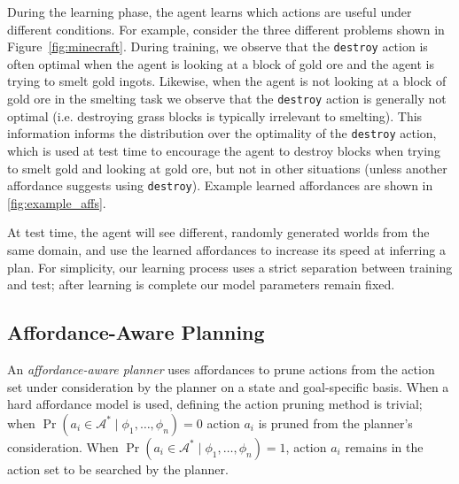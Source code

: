 \documentclass[letterpaper]{article}
\begin{document}
During the learning phase, the agent learns which actions are useful
under different conditions.  For example, consider the three different
problems shown in Figure~\ref{fig:minecraft}.  During training, we observe
that the \texttt{destroy} action is often optimal when the agent is
looking at a block of gold ore and the agent is trying to smelt gold
ingots.  Likewise, when the agent is not looking at a block of gold
ore in the smelting task we observe that the \texttt{destroy} action
is generally not optimal (i.e. destroying grass blocks is typically
irrelevant to smelting).  This information informs the distribution
over the optimality of the \texttt{destroy} action, which is used at
test time to encourage the agent to destroy blocks when trying to
smelt gold and looking at gold ore, but not in other situations
(unless another affordance suggests using \texttt{destroy}). Example
learned affordances are shown in \ref{fig:example_affs}.

At test time, the agent will see different, randomly generated worlds
from the same domain, and use the learned affordances to increase its
speed at inferring a plan.  For simplicity, our learning process uses
a strict separation between training and test; after learning is
complete our model parameters remain fixed. 




\subsection{Affordance-Aware Planning}
\label{sec:action_pruning}
An {\em affordance-aware planner} uses affordances 
to prune actions from the action set under consideration 
by the planner on a state and
goal-specific basis. When a hard affordance model is used, defining
the action pruning method is trivial; when
$\Pr(a_i \in \mathcal{A}^*  \mid \phi_1, \ldots, \phi_n) = 0$
action $a_i$ is pruned from the planner's consideration. When
$\Pr(a_i \in \mathcal{A}^*  \mid \phi_1, \ldots, \phi_n) = 1$,
action $a_i$ remains in the action set to be searched by the planner.
\end{document}
